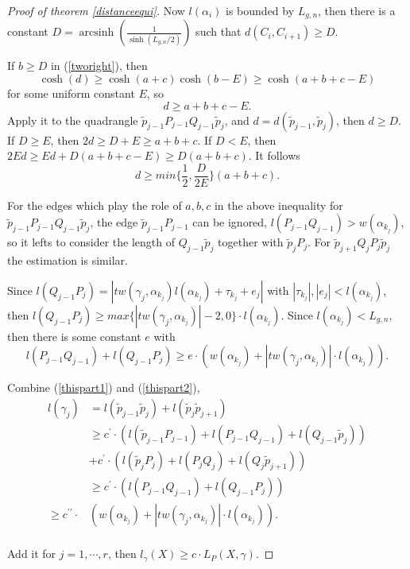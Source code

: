 \begin{proof}[Proof of theorem \ref{distanceequi}]
Now $l(\alpha_i)$ is bounded by $L_{g,n}$, then there is a  constant $D=\operatorname{arcsinh} \left(\frac{1}{\sinh(L_{g,n}/2)}\right)$ such that $d(C_i,C_{i+1})\geq D$.

If $b\geq D$ in (\ref{tworight}), then $$
\cosh(d)\geq \cosh(a+c)\cosh(b-E)\geq \cosh(a+b+c-E)
$$
for some uniform constant $E$, so $$
d\geq a+b+c-E.
$$
Apply it to the quadrangle $\tilde{p}_{j-1}P_{j-1}Q_{j-1}\tilde{p}_{j}$,  and $d=d(\tilde{p}_{j-1},\tilde{p}_{j})$, then $d\geq D$.
If $D\geq E$, then $2d\geq D+E\geq a+b+c$. If $D<E$, then $2Ed\geq Ed+D(a+b+c-E)\geq D(a+b+c)$.
It follows  \begin{equation}\label{thispart1}
d\geq min\{\frac{1}{2},\frac{D}{2E}\}(a+b+c).
\end{equation}

For the edges which play the role of $a,b,c$ in the above  inequality  for   $\tilde{p}_{j-1}P_{j-1}Q_{j-1}\tilde{p}_{j}$,  the edge $\tilde{p}_{j-1}P_{j-1}$ can be ignored, $l(P_{j-1}Q_{j-1})>w(\alpha_{k_j})$, so it lefts to consider the length of $Q_{j-1}\tilde{p}_{j}$  together with $\tilde{p}_{j}P_j$. For $\tilde{p}_{j+1}Q_{j}P_{j}\tilde{p}_{j}$  the estimation is similar.

Since $l(Q_{j-1}P_j)=|tw(\gamma_j,\alpha_{k_j})l(\alpha_{k_j})+\tau_{k_j}+e_j|$ with $|\tau_{k_j}|,|e_j|<l(\alpha_{k_j})$, then $l(Q_{j-1}P_j)\geq max\{|tw(\gamma_j,\alpha_{k_j})|-2,0\}\cdot l(\alpha_{k_j}).$
Since $l(\alpha_{k_j})<L_{g,n}$, then there is some constant $e$ with \begin{equation}\label{thispart2}
l(P_{j-1}Q_{j-1})+l(Q_{j-1}P_j)\geq e\cdot (w(\alpha_{k_j})+|tw(\gamma_j,\alpha_{k_j})|\cdot l(\alpha_{k_j})).
\end{equation}

Combine (\ref{thispart1}) and (\ref{thispart2}),
$$
\begin{aligned}
l(\gamma_j)&=l(\tilde{p}_{j-1}\tilde{p}_j)+l(\tilde{p}_j\tilde{p}_{j+1})\\
&\geq c^\prime\cdot (l(\tilde{p}_{j-1}P_{j-1})+l(P_{j-1}Q_{j-1})+l(Q_{j-1}\tilde{p}_{j}))\\
&+c^\prime\cdot (l(\tilde{p}_jP_j)+l(P_jQ_j)+l(Q_j\tilde{p}_{j+1}))\\
&\geq c^\prime\cdot (l(P_{j-1}Q_{j-1})+l(Q_{j-1}P_j))\\
\geq c^{\prime\prime}\cdot &(w(\alpha_{k_j})+|tw(\gamma_j,\alpha_{k_j})|\cdot l(\alpha_{k_j})).\\
\end{aligned}
$$

Add it for  $j=1,\cdots,r$, then $l_\gamma(X)\geq c\cdot L_P(X,\gamma)$.


\end{proof}
